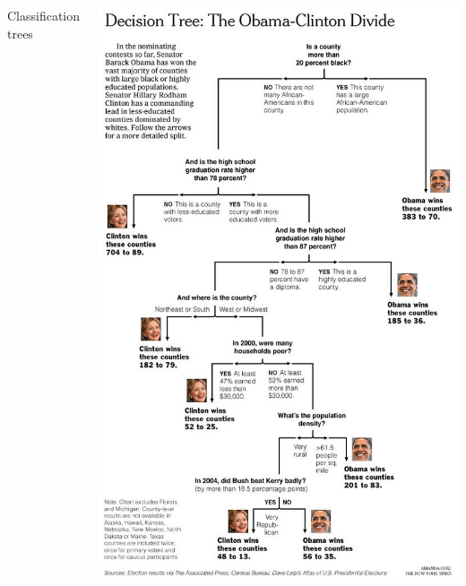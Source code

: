 \documentclass[mathserif, aspectratio=169]{beamer}
\begin{document}
\begin{frame}
\begin{columns}
\begin{center}
{\LARGE Classification trees}
\end{center}
\includegraphics[height=\textheight]{NYT_tree}
\end{columns}
\end{frame}
\end{document}

